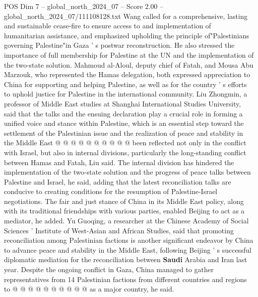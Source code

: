 \begin{textsample}{POS Dim 7 – global\_north\_2024\_07 – Score 2.00 – global\_north\_2024\_07/111108128.txt}
Wang called for a comprehensive, lasting and sustainable cease-fire to ensure access to and implementation of humanitarian assistance, and emphasized upholding the principle of"Palestinians governing Palestine"in Gaza ' s postwar reconstruction.
He also stressed the importance of full membership for Palestine at the UN and the implementation of the two-state solution.
Mahmoud al-Aloul, deputy chief of Fatah, and Mousa Abu Marzouk, who represented the Hamas delegation, both expressed appreciation to China for supporting and helping Palestine, as well as for the country ' s efforts to uphold justice for Palestine in the international community.
Liu Zhongmin, a professor of Middle East studies at Shanghai International Studies University, said that the talks and the ensuing declaration play a crucial role in forming a unified voice and stance within Palestine, which is an essential step toward the settlement of the Palestinian issue and the realization of peace and stability in the Middle East @ @ @ @ @ @ @ @ @ @ been reflected not only in the conflict with Israel, but also in internal divisions, particularly the long-standing conflict between Hamas and Fatah, Liu said.
The internal division has hindered the implementation of the two-state solution and the progress of peace talks between Palestine and Israel, he said, adding that the latest reconciliation talks are conducive to creating conditions for the resumption of Palestine-Israel negotiations.
The fair and just stance of China in its Middle East policy, along with its traditional friendships with various parties, enabled Beijing to act as a mediator, he added.
Yu Guoqing, a researcher at the Chinese Academy of Social Sciences ' Institute of West-Asian and African Studies, said that promoting reconciliation among Palestinian factions is another significant endeavor by China to advance peace and stability in the Middle East, following Beijing ' s successful diplomatic mediation for the reconciliation between \textbf{Saudi} Arabia and Iran last year.
Despite the ongoing conflict in Gaza, China managed to gather representatives from 14 Palestinian factions from different countries and regions to @ @ @ @ @ @ @ @ @ @ as a major country, he said.

\end{textsample}
